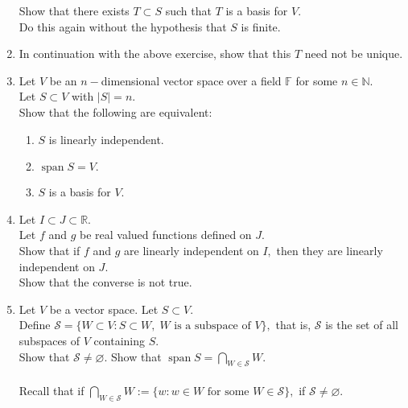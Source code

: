 \documentclass[12pt]{article}
\let\emptyset\varnothing
\begin{document}
\begin{enumerate}[leftmargin=*]
	Show that there exists $T \subset S$ such that $T$ is a basis for $V.$\\
	Do this again without the hypothesis that $S$ is finite.
	\item In continuation with the above exercise, show that this $T$ need not be unique.
	\item Let $V$ be an $n-$dimensional vector space over a field $\mathbb{F}$ for some $n \in \mathbb{N}.$\\
	Let $S \subset V$ with $|S| = n.$\\
	Show that the following are equivalent:
	\begin{enumerate} 
		\item $S$ is linearly independent.
		\item $\operatorname{span} S = V.$
		\item $S$ is a basis for $V.$
	\end{enumerate}
	\item Let $I \subset J \subset \mathbb{R}.$\\
	Let $f$ and $g$ be real valued functions defined on $J.$\\
	Show that if $f$ and $g$ are linearly independent on $I,$ then they are linearly independent on $J.$\\
	Show that the converse is not true.
	\item Let $V$ be a vector space. Let $S \subset V.$\\
	Define $\mathcal{S} = \{W \subset V : S \subset W,\;W \text{ is a subspace of }V\},$ that is, $\mathcal{S}$ is the set of all subspaces of $V$ containing $S.$\\
	Show that $\mathcal{S} \neq \emptyset.$
	Show that $\operatorname{span} S = \displaystyle\bigcap_{W \in \mathcal{S}} W.$\\~\\
	Recall that if $\displaystyle\bigcap_{W \in \mathcal{S}} W := \{w : w \in W \text{ for some }W \in \mathcal{S} \},$ if $\mathcal{S} \neq \emptyset.$
\end{enumerate}
\end{document}
